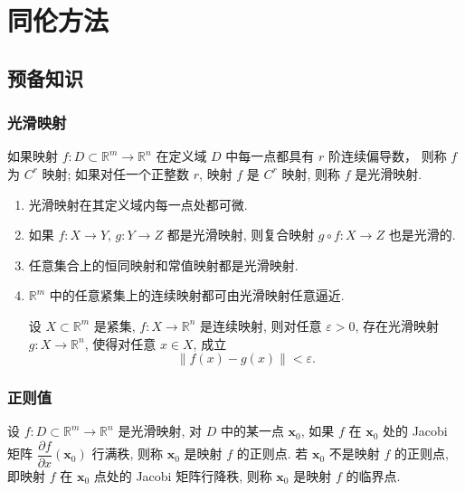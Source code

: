 \section{同伦方法}
\subsection{预备知识}
\subsubsection{光滑映射}

\begin{definition}
如果映射 $f:D\subset\mathbb{R}^m\to\mathbb{R}^n$ 在定义域 $D$ 中每一点都具有 $r$ 阶连续偏导数， 则称 $f$ 为 $C^r$ 映射; 如果对任一个正整数 $r$, 映射 $f$ 是 $C^r$ 映射, 则称 $f$ 是光滑映射.
\end{definition}

\begin{enumerate}
    \item 光滑映射在其定义域内每一点处都可微.
    \item 如果 $f:X\to Y$, $g:Y\to Z$ 都是光滑映射, 则复合映射 $g\circ f:X\to Z$ 也是光滑的.
    \item 任意集合上的恒同映射和常值映射都是光滑映射.
    \item $\mathbb{R}^m$ 中的任意紧集上的连续映射都可由光滑映射任意逼近.
    \begin{theorem}
    设 $X\subset\mathbb{R}^m$ 是紧集, $f: X\to\mathbb{R}^n$ 是连续映射, 则对任意 $\varepsilon > 0$, 存在光滑映射 $g: X\to\mathbb{R}^n$, 使得对任意 $x\in X$, 成立
    \begin{equation*}
        \left\lVert f(x)-g(x)\right\rVert < \varepsilon.
    \end{equation*}
    \end{theorem}
\end{enumerate}

\subsubsection{正则值}

\begin{definition}
设 $f:D\subset\mathbb{R}^m\to\mathbb{R}^n$ 是光滑映射, 对 $D$ 中的某一点 $\boldsymbol{x}_0$, 如果 $f$ 在 $\boldsymbol{x}_0$ 处的 Jacobi 矩阵 $\dfrac{\partial f}{\partial x}\left(\boldsymbol{x}_0\right)$ 行满秩, 则称 $\boldsymbol{x}_0$ 是映射 $f$ 的正则点. 若 $\boldsymbol{x}_0$ 不是映射 $f$ 的正则点, 即映射 $f$ 在 $\boldsymbol{x}_0$ 点处的 Jacobi 矩阵行降秩, 则称 $\boldsymbol{x}_0$ 是映射 $f$ 的临界点.
\end{definition}

